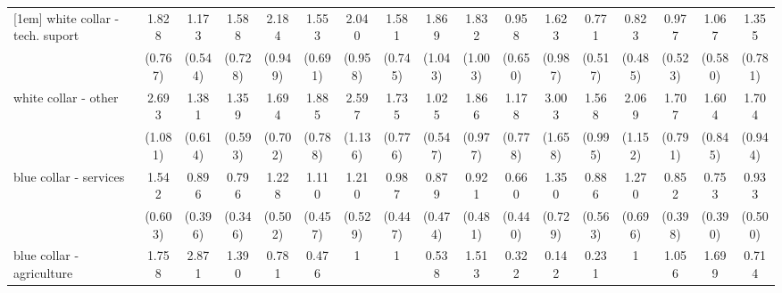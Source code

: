 {\begin{tabular}{l*{16}{c}}
[1em]
white collar - tech. suport&       1.828         &       1.173         &       1.588         &       2.184         &       1.553         &       2.040         &       1.581         &       1.869         &       1.832         &       0.958         &       1.623         &       0.771         &       0.823         &       0.977         &       1.067         &       1.355         \\
                    &     (0.767)         &     (0.544)         &     (0.728)         &     (0.949)         &     (0.691)         &     (0.958)         &     (0.745)         &     (1.043)         &     (1.003)         &     (0.650)         &     (0.987)         &     (0.517)         &     (0.485)         &     (0.523)         &     (0.580)         &     (0.781)         \\
[1em]
white collar - other&       2.693\sym{*}  &       1.381         &       1.359         &       1.694         &       1.885         &       2.597\sym{*}  &       1.735         &       1.025         &       1.866         &       1.178         &       3.003\sym{*}  &       1.568         &       2.069         &       1.707         &       1.604         &       1.704         \\
                    &     (1.081)         &     (0.614)         &     (0.593)         &     (0.702)         &     (0.788)         &     (1.136)         &     (0.776)         &     (0.547)         &     (0.977)         &     (0.778)         &     (1.658)         &     (0.995)         &     (1.152)         &     (0.791)         &     (0.845)         &     (0.944)         \\
[1em]
blue collar - services&       1.542         &       0.896         &       0.796         &       1.228         &       1.110         &       1.210         &       0.987         &       0.879         &       0.921         &       0.660         &       1.350         &       0.886         &       1.270         &       0.852         &       0.753         &       0.933         \\
                    &     (0.603)         &     (0.396)         &     (0.346)         &     (0.502)         &     (0.457)         &     (0.529)         &     (0.447)         &     (0.474)         &     (0.481)         &     (0.440)         &     (0.729)         &     (0.563)         &     (0.696)         &     (0.398)         &     (0.390)         &     (0.500)         \\
[1em]
blue collar - agriculture&       1.758         &       2.871         &       1.390         &       0.781         &       0.476         &           1         &           1         &       0.538         &       1.513         &       0.322         &       0.142         &       0.231         &           1         &       1.056         &       1.699         &       0.714         \\

\end{tabular}}
